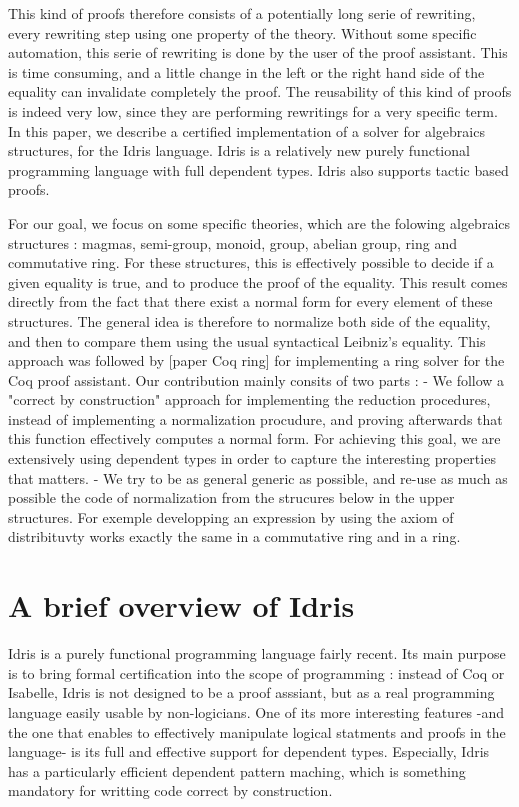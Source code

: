 \documentclass{sigplanconf}
\begin{document}
This kind of proofs therefore consists of a potentially long serie of rewriting, every rewriting step using one property of the theory. Without some specific automation, this serie of rewriting is done by the user of the proof assistant. This is time consuming, and a little change in the left or the right hand side of the equality can invalidate completely the proof. The reusability of this kind of proofs is indeed very low, since they are performing rewritings for a very specific term. In this paper, we describe a certified implementation of a solver for algebraics structures, for the Idris language. Idris is a relatively new purely functional programming language with full dependent types. Idris also supports tactic based proofs. 

For our goal, we focus on some specific theories, which are the folowing algebraics structures : magmas, semi-group, monoid, group, abelian group, ring and commutative ring.
For these structures, this is effectively possible to decide if a given equality is true, and to produce the proof of the equality. This result comes directly from the fact that there exist a normal form for every element of these structures. The general idea is therefore to normalize both side of the equality, and then to compare them using the usual syntactical Leibniz's equality.
This approach was followed by [paper Coq ring] for implementing a ring solver for the Coq proof assistant.
Our contribution mainly consits of two parts :
	- We follow a "correct by construction" approach for implementing the reduction procedures, instead of implementing a normalization procudure, and proving afterwards that this function effectively computes a normal form. For achieving this goal, we are extensively using dependent types in order to capture the interesting properties that matters. 
	- We try to be as general generic as possible, and re-use as much as possible the code of normalization from the strucures below in the upper structures. For exemple developping an expression by using the axiom of distribituvty works exactly the same in a commutative ring and in a ring.

\section{A brief overview of Idris}


Idris is a purely functional programming language fairly recent. Its main purpose is to bring formal certification into the scope of programming : instead of Coq or Isabelle, Idris is not designed to be a proof asssiant, but as a real programming language easily usable by non-logicians. One of its more interesting features -and the one that enables to effectively manipulate logical statments and proofs in the language- is its full and effective support for dependent types. Especially, Idris has a particularly efficient dependent pattern maching, which is something mandatory for writting code correct by construction.
\end{document}
